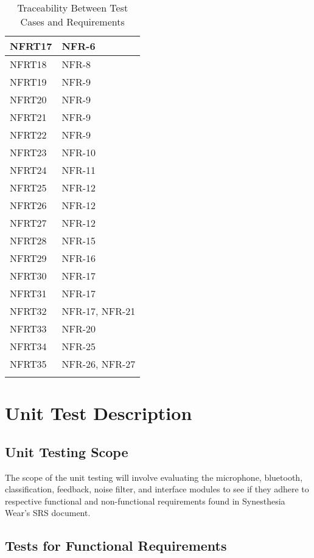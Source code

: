 \documentclass[12pt, titlepage]{article}
\begin{document}
\begin{longtable}{| p{} | p{} |}
  NFRT17 &  NFR-6  \\ \hline
  NFRT18 &  NFR-8  \\ \hline
  NFRT19 &   NFR-9 \\ \hline
  NFRT20 &  NFR-9  \\ \hline
  NFRT21 &  NFR-9  \\ \hline
  NFRT22&  NFR-9  \\ \hline
  NFRT23 &  NFR-10  \\ \hline
  NFRT24 &  NFR-11  \\ \hline
  NFRT25 &  NFR-12  \\ \hline
  NFRT26 &  NFR-12  \\ \hline
  NFRT27 &  NFR-12  \\ \hline
  NFRT28 &  NFR-15 \\ \hline
  NFRT29 &   NFR-16 \\ \hline
  NFRT30 &  NFR-17  \\ \hline
  NFRT31 &   NFR-17 \\ \hline
  NFRT32 &  NFR-17, NFR-21 \\ \hline
  NFRT33 &  NFR-20  \\ \hline
  NFRT34 &  NFR-25  \\ \hline
  NFRT35 &   NFR-26, NFR-27 \\ \hline
  \caption{Traceability Between Test Cases and Requirements} %
  \label{tab:myfirstlongtable}
  \end{longtable}
\section{Unit Test Description}


\subsection{Unit Testing Scope}
The scope of the unit testing will involve evaluating the microphone, bluetooth, 
classification, feedback, noise filter, and interface modules to see if they adhere 
to respective functional and non-functional requirements found in Synesthesia Wear’s 
SRS document.

\subsection{Tests for Functional Requirements}
\end{document}
